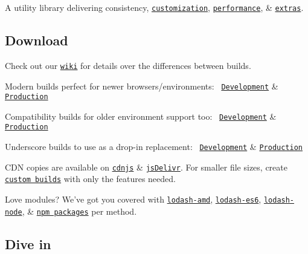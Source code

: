 A utility library delivering consistency, \href{https://lodash.com/custom-builds}{\tt customization}, \href{https://lodash.com/benchmarks}{\tt performance}, \& \href{https://lodash.com/#features}{\tt extras}.

\subsection*{Download}

Check out our \href{[https://github.com/lodash/lodash/wiki/build-differences]}{\tt wiki} for details over the differences between builds.


\begin{DoxyItemize}
\item Modern builds perfect for newer browsers/environments\+:~\newline
 \href{https://raw.github.com/lodash/lodash/2.4.2/dist/lodash.js}{\tt Development} \& \href{https://raw.github.com/lodash/lodash/2.4.2/dist/lodash.min.js}{\tt Production}
\item Compatibility builds for older environment support too\+:~\newline
 \href{https://raw.github.com/lodash/lodash/2.4.2/dist/lodash.compat.js}{\tt Development} \& \href{https://raw.github.com/lodash/lodash/2.4.2/dist/lodash.compat.min.js}{\tt Production}
\item Underscore builds to use as a drop-\/in replacement\+:~\newline
 \href{https://raw.github.com/lodash/lodash/2.4.2/dist/lodash.underscore.js}{\tt Development} \& \href{https://raw.github.com/lodash/lodash/2.4.2/dist/lodash.underscore.min.js}{\tt Production}
\end{DoxyItemize}

C\+D\+N copies are available on \href{http://cdnjs.com/libraries/lodash.js/}{\tt cdnjs} \& \href{http://www.jsdelivr.com/#!lodash}{\tt js\+Delivr}. For smaller file sizes, create \href{https://lodash.com/custom-builds}{\tt custom builds} with only the features needed.

Love modules? We’ve got you covered with \href{https://npmjs.org/package/lodash-amd}{\tt lodash-\/amd}, \href{https://github.com/lodash/lodash-es6}{\tt lodash-\/es6}, \href{https://npmjs.org/package/lodash-node}{\tt lodash-\/node}, \& \href{https://npmjs.org/browse/keyword/lodash-modularized}{\tt npm packages} per method.

\subsection*{Dive in}

